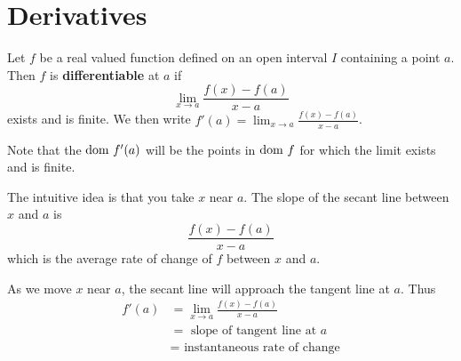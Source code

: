 \documentclass{article}
\begin{document}
\section{Derivatives}
\begin{definition}
Let $f$ be a real valued function defined on an open interval $I$ containing a point $a$. Then $f$ is \textbf{differentiable} at $a$ if \[
\lim_{x\to a}\frac{f(x) - f(a)}{x-a}\] exists and is finite. We then write $f'(a) = \lim_{x\to a}\frac{f(x) - f(a)}{x-a}$.

Note that the $\text{dom } f'(a)$ will be the points in $\text{dom } f$ for which the limit exists and is finite.
\end{definition}
\begin{remark}
The intuitive idea is that you take $x$ near $a$. The slope of the secant line between $x$ and $a$ is \[
\frac{f(x) - f(a)}{x-a}
\] which is the average rate of change of $f$ between $x$ and $a$.

As we move $x$ near $a$, the secant line will approach the tangent line at $a$.
Thus \begin{align*}
    f'(a) &= \lim_{x\to a}\frac{f(x) - f(a)}{x-a}\\
    &= \text{ slope of tangent line at } a\\
    &= \text{ instantaneous rate of change}
\end{align*}
\end{remark}
\end{document}
